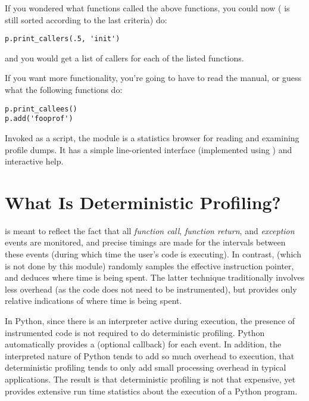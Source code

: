 If you wondered what functions called the above functions, you could
now ( is still sorted according to the last criteria) do:

\begin{verbatim}
p.print_callers(.5, 'init')
\end{verbatim}

and you would get a list of callers for each of the listed functions. 

If you want more functionality, you're going to have to read the
manual, or guess what the following functions do:

\begin{verbatim}
p.print_callees()
p.add('fooprof')
\end{verbatim}

Invoked as a script, the  module is a statistics
browser for reading and examining profile dumps.  It has a simple
line-oriented interface (implemented using ) and
interactive help.

\section{What Is Deterministic Profiling?}

 is meant to reflect the fact that all
\emph{function call}, \emph{function return}, and \emph{exception} events
are monitored, and precise timings are made for the intervals between
these events (during which time the user's code is executing).  In
contrast,  (which is not done by this
module) randomly samples the effective instruction pointer, and
deduces where time is being spent.  The latter technique traditionally
involves less overhead (as the code does not need to be instrumented),
but provides only relative indications of where time is being spent.

In Python, since there is an interpreter active during execution, the
presence of instrumented code is not required to do deterministic
profiling.  Python automatically provides a  (optional
callback) for each event.  In addition, the interpreted nature of
Python tends to add so much overhead to execution, that deterministic
profiling tends to only add small processing overhead in typical
applications.  The result is that deterministic profiling is not that
expensive, yet provides extensive run time statistics about the
execution of a Python program.

